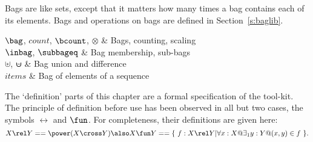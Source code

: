 Bags are like sets, except that it matters how many times a bag
contains each of its elements.  Bags and operations
on bags are defined in Section~\ref{s:baglib}.
\begin{menu}
        $\bag$, $count$, $\bcount$, $\otimes$
		& Bags, counting, scaling	 	 \\
	$\inbag$, $\subbageq$
		& Bag membership, sub-bags		 \\
        $\uplus$, $\uminus$
		& Bag union and difference	 	 \\
        $items$
		& Bag of elements of a sequence 	%
							\label{p:symlist-}
\end{menu}

The `definition' parts of this chapter are a formal
specification of the tool-kit. The principle of definition
before use has been observed in all but
two cases, the symbols $\rel$ and $\fun$.
For completeness, their definitions are given here:\label{p:forward}
\[
        X \rel Y  ==  \power (X \cross Y)
\also
        X \fun Y  ==  \{~f: X \rel Y | %
                \forall x: X @ \exists_1 y: Y @ (x, y) \in f~\}.
\]
\newpage
